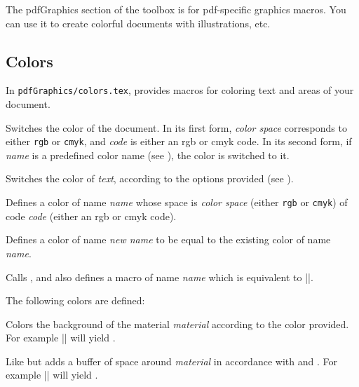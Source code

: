 The pdfGraphics section of the \pdftoolbox{} toolbox is for pdf-specific graphics macros.
You can use it to create colorful documents with illustrations, etc.

\subsection{Colors}

In {\tt pdfGraphics/colors.tex}, \pdftoolbox{} provides macros for coloring text and areas of your document.

Switches the color of the document.
In its first form, {\it color space} corresponds to either {\tt rgb} or {\tt cmyk}, and {\it code} is either an rgb or cmyk code.
In its second form, if {\it name} is a predefined color name (see \gotomacro\definecolor), the color is switched to it.
\emacroexp

Switches the color of {\it text}, according to the options provided (see \gotomacro\color).
\emacroexp

Defines a color of name {\it name} whose space is {\it color space} (either {\tt rgb} or {\tt cmyk}) of code {\it code} (either an rgb or cmyk code).
\emacroexp

Defines a color of name {\it new name} to be equal to the existing color of name {\it name}.
\emacroexp

Calls \gotomacro\definecolor, and also defines a macro of name {\it name} which is equivalent to \inlinecode||.

The following colors are defined:

\centerline{         }
\emacroexp

Colors the background of the material {\it material} according to the color provided.
For example \inlinecode|| will yield .
\emacroexp

Like \gotomacro\highlightbox{} but adds a buffer of space around {\it material} in accordance with \macro\bufferwidth\anchormacro\bufferwidth{} and \macro\bufferheight\anchormacro\bufferheight.
For example \inlinecode|| will yield .
\emacroexp

